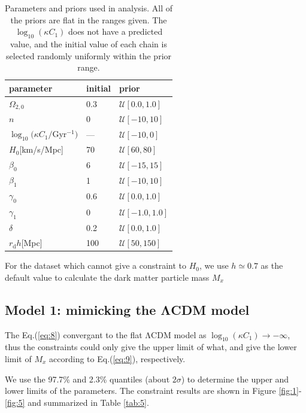 \documentclass[twocolumn]{aastex631}
\begin{document}
   \begin{table}[htbp]
      \centering
      \begin{tabular}{lll}
         \hline\hline
         parameter & initial & prior \\
         \hline
         $\Omega_{2,0}$ & 0.3 & $\mathcal{U}[0.0,1.0]$ \\
         $n$ & 0 & $\mathcal{U}[-10,10]$ \\
         $\log_{10}(\kappa C_1/$Gyr${}^{-1})$ & --- & $\mathcal{U}[-10,0]$ \\
         $H_0$[km/s/Mpc] & 70 & $\mathcal{U}[60,80]$ \\
         \hline
         $\beta_0$ & 6 & $\mathcal{U}[-15,15]$ \\
         $\beta_1$ & 1 & $\mathcal{U}[-10,10]$ \\
         $\gamma_0$ & 0.6 & $\mathcal{U}[0.0,1.0]$ \\
         $\gamma_1$ & 0 & $\mathcal{U}[-1.0,1.0]$ \\         
         $\delta$ & 0.2 & $\mathcal{U}[0.0,1.0]$ \\
         \hline
         $r_{\text{d}}h$[Mpc] & 100 & $\mathcal{U}[50,150]$ \\
         \hline
      \end{tabular}
      \caption{Parameters and priors used in analysis. 
      All of the priors are flat in the ranges given. 
      The $\log_{10}(\kappa C_1)$ does not have a predicted value, 
      and the initial value of each chain is selected randomly uniformly
      within the prior range.}
      \label{tab:4}
   \end{table}

   For the dataset which cannot give a constraint to $H_0$, 
   we use $h \simeq 0.7$ as the default value to calculate the 
   dark matter particle mass $M_x$

\subsection{Model 1: mimicking the ΛCDM model}

   The Eq.(\ref{eq:8}) convergant to the flat ΛCDM model as
   $\log_{10}(\kappa C_1)\to-\infty$, thus the constraints
   could only give the upper limit of what, and give the lower limit
   of $M_x$ according to Eq.(\ref{eq:9}), respectively.

   We use the 97.7\% and 2.3\% quantiles (about $2\sigma$) to determine the upper and lower
   limits of the parameters. The  constraint results are shown in 
   Figure \ref{fig:1}-\ref{fig:5} and summarized in Table \ref{tab:5}.
\end{document}
